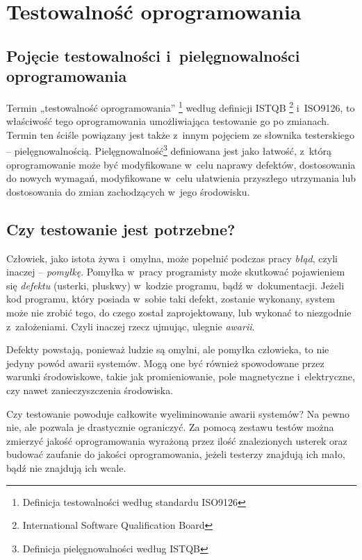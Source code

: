 \chapter{Testowalność oprogramowania}
\label{testowalnosc}
\section{Pojęcie testowalności i~pielęgnowalności \newline oprogramowania}
Termin „testowalność oprogramowania” \footnote{Definicja testowalności według standardu ISO9126}  według definicji ISTQB \footnote{International Software Qualification Board}  i~ISO9126, to właściwość tego oprogramowania umożliwiająca testowanie go po zmianach. Termin ten ściśle powiązany jest także z~innym pojęciem ze słownika testerskiego – pielęgnowalnością. Pielęgnowalność\footnote{Definicja pielęgnowalności według ISTQB} definiowana jest jako łatwość, z~którą oprogramowanie może być modyfikowane w~celu naprawy defektów, dostosowania do nowych wymagań, modyfikowane w~celu ułatwienia przyszłego utrzymania lub dostosowania do zmian zachodzących w~jego środowisku.

\section{Czy testowanie jest potrzebne?}
\label{czy_testowanie_potrzebne}
Człowiek, jako istota żywa i~omylna, może popełnić podczas pracy \textit{błąd}, czyli inaczej – \textit{pomyłkę}. Pomyłka w~pracy programisty może skutkować pojawieniem się \textit{defektu} (usterki, pluskwy) w~kodzie programu, bądź w~dokumentacji. Jeżeli kod programu, który posiada w~sobie taki defekt, zostanie wykonany, system może nie zrobić tego, do czego został zaprojektowany, lub wykonać to niezgodnie z~założeniami. Czyli inaczej rzecz ujmując, ulegnie \textit{awarii}. 

Defekty powstają, ponieważ ludzie są omylni, ale pomyłka człowieka, to nie jedyny powód awarii systemów. Mogą one być również spowodowane przez warunki środowiskowe, takie jak promieniowanie, pole magnetyczne i~elektryczne, czy nawet zanieczyszczenia środowiska.

Czy testowanie powoduje całkowite wyeliminowanie awarii systemów? Na pewno nie, ale pozwala je drastycznie ograniczyć. Za pomocą zestawu testów można zmierzyć jakość oprogramowania wyrażoną przez ilość znalezionych usterek oraz budować zaufanie do jakości oprogramowania, jeżeli testerzy znajdują ich mało, bądź nie znajdują ich wcale.

